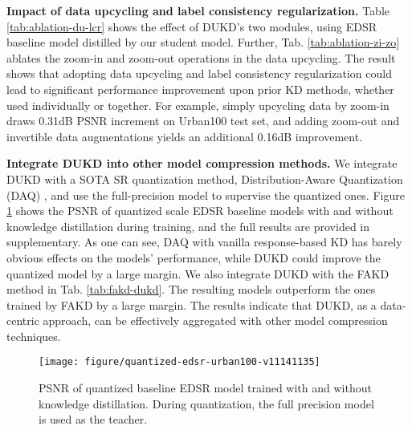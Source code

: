 \documentclass[10pt,twocolumn,letterpaper]{article}
\newcommand{\red}[1]{{\color{black}#1}}
\begin{document}
 \noindent\textbf{Impact of data upcycling and label consistency regularization.}
Table \ref{tab:ablation-du-lcr} shows the effect of DUKD's two modules, using EDSR baseline model distilled by our student model. Further, Tab. \ref{tab:ablation-zi-zo} ablates the zoom-in and zoom-out operations in the data upcycling.
The result shows that adopting data upcycling and label consistency regularization could lead to significant performance improvement upon prior KD methods, whether used individually or together. 
For example, simply upcycling data by zoom-in draws 0.31dB PSNR increment on Urban100 test set, and adding zoom-out and invertible data augmentations yields an additional 0.16dB improvement. 

\vspace{0.75em}
\red{
\noindent\textbf{Integrate DUKD into other model compression methods.} We integrate DUKD with a SOTA SR quantization method, Distribution-Aware Quantization (DAQ) \cite{hong2022daq}, and use the full-precision model to supervise the quantized ones. Figure \ref{fig:dukd_quantized} shows the PSNR of quantized \texttimes 4 scale EDSR baseline models with and without knowledge distillation during training, and the full results are provided in supplementary. As one can see, DAQ with vanilla response-based KD
has barely obvious effects on the models' performance, while DUKD could improve the quantized model by a large margin. 
We also integrate DUKD with the FAKD method in Tab. \ref{tab:fakd-dukd}. The resulting models outperform the ones trained by FAKD by a large margin.
The results indicate that DUKD, as a data-centric approach, can be effectively aggregated with other model compression techniques.

}

\begin{figure}
    \centering
    \texttt{[image: figure/quantized-edsr-urban100-v11141135]}\vspace{-0.5em}
    \caption{PSNR of quantized baseline EDSR model trained with and without knowledge distillation. During quantization, the full precision model is used as the teacher.}\vspace{-0.75em}
    \label{fig:dukd_quantized}
\end{figure}
\end{document}
